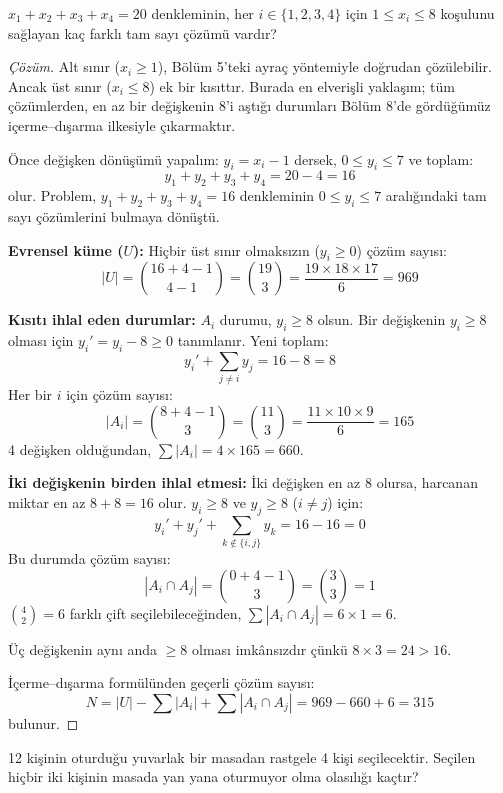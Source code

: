 \begin{example}
$x_1 + x_2 + x_3 + x_4 = 20$ denkleminin, her $i \in \{1,2,3,4\}$ için $1 \le x_i \le 8$ koşulunu sağlayan kaç farklı tam sayı çözümü vardır?
\end{example}

\begin{proof}[Çözüm]
Alt sınır ($x_i \ge 1$), Bölüm 5'teki ayraç yöntemiyle doğrudan çözülebilir. Ancak üst sınır ($x_i \le 8$) ek bir kısıttır. Burada en elverişli yaklaşım; tüm çözümlerden, en az bir değişkenin 8'i aştığı durumları Bölüm 8'de gördüğümüz içerme--dışarma ilkesiyle çıkarmaktır.

Önce değişken dönüşümü yapalım: $y_i = x_i - 1$ dersek, $0 \le y_i \le 7$ ve toplam:
\[
y_1 + y_2 + y_3 + y_4 = 20 - 4 = 16
\]
olur. Problem, $y_1 + y_2 + y_3 + y_4 = 16$ denkleminin $0 \le y_i \le 7$ aralığındaki tam sayı çözümlerini bulmaya dönüştü.

\textbf{Evrensel küme ($U$):} Hiçbir üst sınır olmaksızın ($y_i \ge 0$) çözüm sayısı:
\[
|U| = \binom{16 + 4 - 1}{4 - 1} = \binom{19}{3} = \frac{19 \times 18 \times 17}{6} = 969
\]

\textbf{Kısıtı ihlal eden durumlar:} $A_i$ durumu, $y_i \ge 8$ olsun.
Bir değişkenin $y_i \ge 8$ olması için $y_i' = y_i - 8 \ge 0$ tanımlanır. Yeni toplam:
\[
y_i' + \sum_{j \ne i} y_j = 16 - 8 = 8
\]
Her bir $i$ için çözüm sayısı:
\[
|A_i| = \binom{8 + 4 - 1}{3} = \binom{11}{3} = \frac{11 \times 10 \times 9}{6} = 165
\]
4 değişken olduğundan, $\sum |A_i| = 4 \times 165 = 660$.

\textbf{İki değişkenin birden ihlal etmesi:} İki değişken en az 8 olursa, harcanan miktar en az $8 + 8 = 16$ olur.
$y_i \ge 8$ ve $y_j \ge 8$ ($i \ne j$) için:
\[
y_i' + y_j' + \sum_{k \notin \{i,j\}} y_k = 16 - 16 = 0
\]
Bu durumda çözüm sayısı:
\[
|A_i \cap A_j| = \binom{0 + 4 - 1}{3} = \binom{3}{3} = 1
\]
$\binom{4}{2} = 6$ farklı çift seçilebileceğinden, $\sum |A_i \cap A_j| = 6 \times 1 = 6$.

Üç değişkenin aynı anda $\ge 8$ olması imkânsızdır çünkü $8 \times 3 = 24 > 16$.

İçerme--dışarma formülünden geçerli çözüm sayısı:
\[
N = |U| - \sum |A_i| + \sum |A_i \cap A_j| = 969 - 660 + 6 = 315
\]
bulunur.
\end{proof}

\begin{example}
12 kişinin oturduğu yuvarlak bir masadan rastgele 4 kişi seçilecektir. Seçilen hiçbir iki kişinin masada yan yana oturmuyor olma olasılığı kaçtır?
\end{example}

